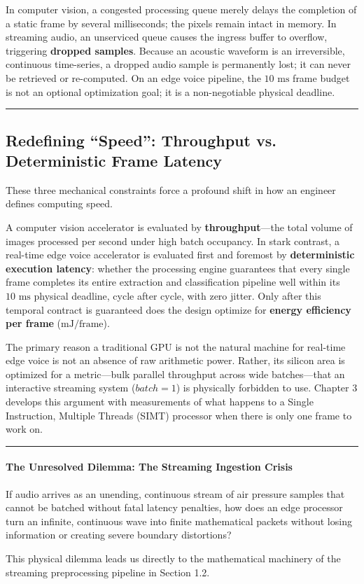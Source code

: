 \documentclass[11pt,a4paper]{article}
\begin{document}
In computer vision, a congested processing queue merely delays the completion of a static frame by several milliseconds; the pixels remain intact in memory. In streaming audio, an unserviced queue causes the ingress buffer to overflow, triggering \textbf{dropped samples}. Because an acoustic waveform is an irreversible, continuous time-series, a dropped audio sample is permanently lost; it can never be retrieved or re-computed. On an edge voice pipeline, the $10\text{ ms}$ frame budget is not an optional optimization goal; it is a non-negotiable physical deadline.

\medskip
\hrule
\medskip

\subsection*{Redefining ``Speed'': Throughput vs. Deterministic Frame Latency}

These three mechanical constraints force a profound shift in how an engineer defines computing speed.

A computer vision accelerator is evaluated by \textbf{throughput}---the total volume of images processed per second under high batch occupancy. In stark contrast, a real-time edge voice accelerator is evaluated first and foremost by \textbf{deterministic execution latency}: whether the processing engine guarantees that every single frame completes its entire extraction and classification pipeline well within its $10\text{ ms}$ physical deadline, cycle after cycle, with zero jitter. Only after this temporal contract is guaranteed does the design optimize for \textbf{energy efficiency per frame} ($\text{mJ/frame}$).

The primary reason a traditional GPU is not the natural machine for real-time edge voice is not an absence of raw arithmetic power. Rather, its silicon area is optimized for a metric---bulk parallel throughput across wide batches---that an interactive streaming system ($batch = 1$) is physically forbidden to use. Chapter 3 develops this argument with measurements of what happens to a Single Instruction, Multiple Threads (SIMT) processor when there is only one frame to work on.

\medskip
\hrule
\medskip

\paragraph{The Unresolved Dilemma: The Streaming Ingestion Crisis}
If audio arrives as an unending, continuous stream of air pressure samples that cannot be batched without fatal latency penalties, how does an edge processor turn an infinite, continuous wave into finite mathematical packets without losing information or creating severe boundary distortions?

This physical dilemma leads us directly to the mathematical machinery of the streaming preprocessing pipeline in Section 1.2.
\end{document}
